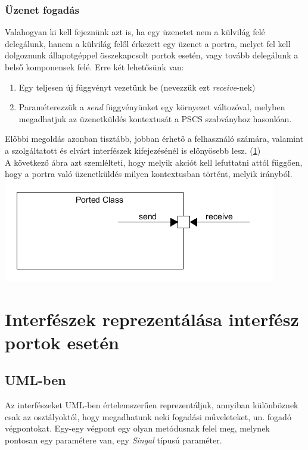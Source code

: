 \documentclass[a4paper,12pt]{report}
\begin{document}
\subsubsection{Üzenet fogadás}
Valahogyan ki kell fejeznünk azt is, ha egy üzenetet nem a külvilág felé delegálunk, hanem a külvilág felől érkezett egy üzenet a portra, melyet fel kell dolgoznunk állapotgéppel összekapcsolt portok esetén, vagy tovább delegálunk a belső komponensek felé. Erre két lehetősünk van:
\begin{enumerate}
\item Egy teljesen új függvényt vezetünk be (nevezzük ezt \textit{receive}-nek)
\item Paraméterezzük a \textit{send} függvényünket egy környezet változóval, melyben megadhatjuk az üzenetküldés kontextusát a PSCS szabványhoz hasonlóan.
\end{enumerate} 
Előbbi megoldás azonban tisztább, jobban érhető a felhasználó számára, valamint a szolgáltatott és elvárt interfészek kifejezésénél is előnyösebb lesz. (\ref{inf}) \\

A következő ábra azt szemlélteti, hogy melyik akciót kell lefuttatni attól függően, hogy a portra való üzenetküldés milyen kontextusban történt, melyik irányból. \\

\includegraphics[scale=0.8]{send_rec.png}

\section{Interfészek reprezentálása interfész portok esetén} \label{inf}
\subsection{UML-ben}
Az interfészeket UML-ben értelemszerűen reprezentáljuk, annyiban különböznek csak az osztályoktól, hogy megadhatunk neki fogadási műveleteket, un. fogadó végpontokat. Egy-egy végpont egy olyan metódusnak felel meg, melynek pontosan egy paramétere van, egy \textit{Singal} típusú paraméter. 
\end{document}
